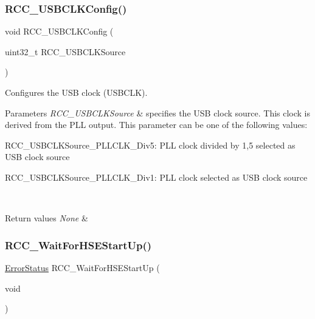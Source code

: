 \subsubsection{\texorpdfstring{RCC\_USBCLKConfig()}{RCC\_USBCLKConfig()}}
{\footnotesize\ttfamily void R\+C\+C\+\_\+\+U\+S\+B\+C\+L\+K\+Config (\begin{DoxyParamCaption}\item[{uint32\+\_\+t}]{R\+C\+C\+\_\+\+U\+S\+B\+C\+L\+K\+Source }\end{DoxyParamCaption})}



Configures the U\+SB clock (U\+S\+B\+C\+LK). 


\begin{DoxyParams}{Parameters}
{\em R\+C\+C\+\_\+\+U\+S\+B\+C\+L\+K\+Source} & specifies the U\+SB clock source. This clock is derived from the P\+LL output. This parameter can be one of the following values\+: \begin{DoxyItemize}
\item R\+C\+C\+\_\+\+U\+S\+B\+C\+L\+K\+Source\+\_\+\+P\+L\+L\+C\+L\+K\+\_\+Div5\+: P\+LL clock divided by 1,5 selected as U\+SB clock source \item R\+C\+C\+\_\+\+U\+S\+B\+C\+L\+K\+Source\+\_\+\+P\+L\+L\+C\+L\+K\+\_\+\+Div1\+: P\+LL clock selected as U\+SB clock source \end{DoxyItemize}
\\
\hline
\end{DoxyParams}

\begin{DoxyRetVals}{Return values}
{\em None} & \\
\hline
\end{DoxyRetVals}
\mbox{\label{group___r_c_c___private___functions_gae0f15692614dd048ee4110a056f001dc}} 
\subsubsection{\texorpdfstring{RCC\_WaitForHSEStartUp()}{RCC\_WaitForHSEStartUp()}}
{\footnotesize\ttfamily \mbox{\hyperlink{group___exported__types_ga8333b96c67f83cba354b3407fcbb6ee8}{Error\+Status}} R\+C\+C\+\_\+\+Wait\+For\+H\+S\+E\+Start\+Up (\begin{DoxyParamCaption}\item[{void}]{ }\end{DoxyParamCaption})}




